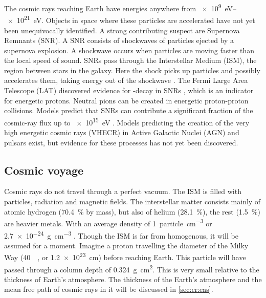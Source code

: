 The cosmic rays reaching Earth have energies anywhere from \SIrange{e9}{e21}{\eV}. Objects in space where these particles are accelerated have not yet been unequivocally identified. A strong contributing suspect are Supernova Remnants (SNR). A SNR consists of shockwaves of particles ejected by a supernova explosion. A shockwave occurs when particles are moving faster than the local speed of sound. SNRs pass through the Interstellar Medium (ISM), the region between stars in the galaxy. Here the shock picks up particles and possibly accelerates them, taking energy out of the shockwave \cite{helder2009snr}. The Fermi Large Area Telescope (LAT) discovered evidence for \Pgpz-decay in SNRs \cite{ackermann2013snr}, which is an indicator for energetic protons. Neutral pions can be created in energetic proton-proton collisions. Models predict that SNRs can contribute a significant fraction of the cosmic-ray flux up to \SI{e15}{\eV} \cite{cardillo2015snr}. Models predicting the creation of the very high energetic cosmic rays (VHECR) in Active Galactic Nuclei (AGN) and pulsars exist, but evidence for these processes has not yet been discovered.


\subsection{Cosmic voyage}

Cosmic rays do not travel through a perfect vacuum. The ISM is filled with particles, radiation and magnetic fields. The interstellar matter consists mainly of atomic hydrogen (\SI{70.4}{\percent} by mass), but also of helium (\SI{28.1}{\percent}), the rest (\SI{1.5}{\percent}) are heavier metals. With an average density of \SI{1}{particle\per\centi\meter\cubed} or \SI{2.7e-24}{\gram\per\centi\meter\cubed} \cite{ferriere2001ism}. Though the ISM is far from homogenous, it will be assumed for a moment. Imagine a proton travelling the diameter of the Milky Way (\SI{40}{\kilo\parsec}, or \SI{1.2e23}{\cm}) before reaching Earth. This particle will have passed through a column depth of \SI{0.324}{\gram\centi\meter\squared}. This is very small relative to the thickness of Earth's atmosphere. The thickness of the Earth's atmosphere and the mean free path of cosmic rays in it will be discussed in \cref{sec:cr:eas}.

